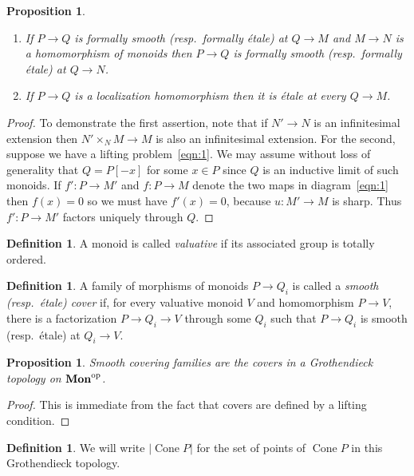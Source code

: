 \documentclass[12pt]{amsart}
\newtheorem{proposition}[theorem]{Proposition}
\theoremstyle{definition}
\newtheorem{definition}[theorem]{Definition}
\theoremstyle{remark}
\def\Mon{\mathbf{Mon}}
\def\Cone{\operatorname{Cone}}
\begin{document}
\begin{proposition} \label{prop:triv-smooth-etale}
\begin{enumerate}
\item If $P \to Q$ is formally smooth (resp.\ formally \'etale) at $Q \to M$ and $M \to N$ is a homomorphism of monoids then $P \to Q$ is formally smooth (resp.\ formally \'etale) at $Q \to N$.
\item If $P \to Q$ is a localization homomorphism then it is \'etale at every $Q \to M$.
\end{enumerate}
\end{proposition}
\begin{proof}
To demonstrate the first assertion, note that if $N' \to N$ is an infinitesimal extension then $N' \mathop\times_N M \to M$ is also an infinitesimal extension.  For the second, suppose we have a lifting problem~\eqref{eqn:1}.  We may assume without loss of generality that $Q = P[-x]$ for some $x \in P$ since $Q$ is an inductive limit of such monoids.  If $f' : P \to M'$ and $f : P \to M$ denote the two maps in diagram~\eqref{eqn:1} then $f(x) = 0$ so we must have $f'(x) = 0$, because $u : M' \to M$ is sharp.  Thus $f' : P \to M'$ factors uniquely through $Q$.
\end{proof}

\begin{definition}
A monoid is called \emph{valuative} if its associated group is totally ordered.
\end{definition}

\begin{definition}
A family of morphisms of monoids $P \to Q_i$ is called a \emph{smooth (resp.\ \'etale) cover} if, for every valuative monoid $V$ and homomorphism $P \to V$, there is a factorization $P \to Q_i \to V$ through some $Q_i$ such that $P \to Q_i$ is smooth (resp.\ \'etale) at $Q_i \to V$.
\end{definition}

\begin{proposition}
Smooth covering families are the covers in a Grothendieck topology on $\Mon^{\rm op}$.
\end{proposition}
\begin{proof}
This is immediate from the fact that covers are defined by a lifting condition.
\end{proof}

\begin{definition}
We will write $|\Cone P|$ for the set of points of $\Cone P$ in this Grothendieck topology.
\end{definition}
\end{document}
